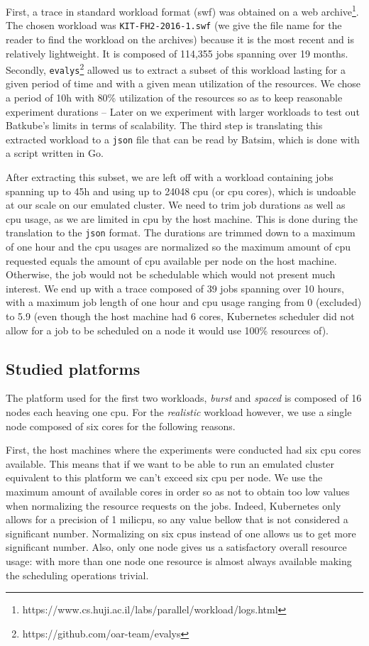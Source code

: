 First, a trace in standard workload format (swf) was obtained on a web
archive\footnote{https://www.cs.huji.ac.il/labs/parallel/workload/logs.html}.
The chosen workload was \texttt{KIT-FH2-2016-1.swf} (we give the file name for
the reader to find the workload on the archives) because it is the most recent
and is relatively lightweight. It is composed of 114,355 jobs spanning over 19
months. Secondly, \texttt{evalys}\footnote{https://github.com/oar-team/evalys}
allowed us to extract a subset of this workload lasting for a given period of
time and with a given mean utilization of the resources. We chose a period of
10h with 80\% utilization of the resources so as to keep reasonable experiment
durations -- Later on we experiment with larger workloads to test out Batkube's
limits in terms of scalability.  The third step is translating this extracted
workload to a \texttt{json} file that can be read by Batsim, which is done with
a script written in Go.

After extracting this subset, we are left off with a workload containing jobs
spanning up to 45h and using up to 24048 cpu (or cpu cores), which is undoable
at our scale on our emulated cluster. We need to trim job durations as well as
cpu usage, as we are limited in cpu by the host machine. This is done during
the translation to the \texttt{json} format. The durations are trimmed down to
a maximum of one hour and the cpu usages are normalized so the maximum amount
of cpu requested equals the amount of cpu available per node on the host
machine. Otherwise, the job would not be schedulable which would not present
much interest. We end up with a trace composed of 39 jobs spanning over 10
hours, with a maximum job length of one hour and cpu usage ranging from 0
(excluded) to 5.9 (even though the host machine had 6 cores, Kubernetes
scheduler did not allow for a job to be scheduled on a node it would use 100\%
resources of).

\subsection{Studied platforms}

The platform used for the first two workloads, \textit{burst} and
\textit{spaced} is composed of 16 nodes each heaving one cpu. For the
\textit{realistic} workload however, we use a single node composed of six cores
for the following reasons.

First, the host machines where the experiments were conducted had six cpu cores
available. This means that if we want to be able to run an emulated cluster
equivalent to this platform we can't exceed six cpu per node.  We use the
maximum amount of available cores in order so as not to obtain too low values
when normalizing the resource requests on the jobs. Indeed, Kubernetes only
allows for a precision of 1 milicpu, so any value bellow that is not considered
a significant number. Normalizing on six cpus instead of one allows us to get
more significant number. Also, only one node gives us a satisfactory overall
resource usage: with more than one node one resource is almost always available
making the scheduling operations trivial.


